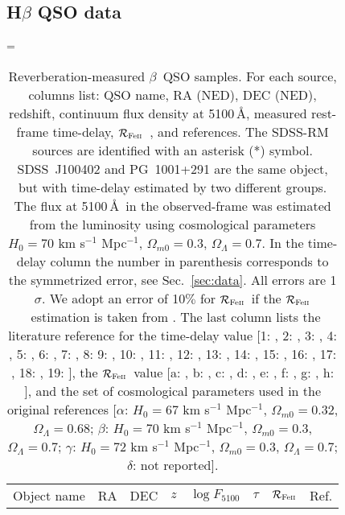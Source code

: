 \documentclass[a4paper,fleqn,usenatbib]{mnras}
\newcommand{\rfe}{${\cal R}_{\rm{Fe\textsc{ii}}}$}
\newcommand{\hb}{{\sc{H}}$\beta$\/}
\begin{document}

\onecolumn
\begin{appendix}
\section{H$\beta$ QSO data}
\label{sec:appendix}
\addtolength{\tabcolsep}{0pt}
\LTcapwidth=\linewidth
\begin{longtable}{cccccccc}
\caption{Reverberation-measured \hb\ QSO samples. For each source, columns list: QSO name, RA (NED), DEC (NED), redshift, continuum flux density at 5100\,\AA, measured rest-frame time-delay, \rfe\ , and references. The SDSS-RM sources are identified with an asterisk (*) symbol. SDSS~J100402 and PG~1001+291 are the same object, but with time-delay estimated by two different groups. The flux at 5100\,\AA\ in the observed-frame was estimated from the luminosity using cosmological parameters $H_0 = 70$ km s$^{-1}$ Mpc$^{-1}$, $\Omega_{m0} = 0.3$, $\Omega_\Lambda = 0.7$. In the time-delay column the number in parenthesis corresponds to the symmetrized error, see Sec.~\ref{sec:data}. All errors are 1$\sigma$. We adopt an error of 10$\%$ for \rfe\ if the \rfe\ estimation is taken from \citet{duwang_2019}. The last column lists the literature reference for the time-delay value [1: \citet{2014ApJ...782...45D}, 2: \citet{wangSEAMBH2014}, 3: \citet{2018ApJ...856....6D}, 4: \citet{2017ApJ...851...21G}, 5: \citet{2013ApJ...767..149B}, 6: \citet{bentz2009}, 7:  \citet{bentz2014}, 8: \citet{pei2014} 9: \citet{bentz2016a}, 10:  \citet{zhang2018}, 11: \citet{lu2016}, 12: \citet{rakshit2020}, 13: \citet{du2015}, 14: \citet{du2016}, 15: \citet{barth2013}, 16: \citet{bentz2016a}, 17: \citet{fausnaugh2017}, 18: \citet{huang2019}, 19: \citet{li_2021}], the \rfe\ value [a: \citet{hu2015}, b: \citet{duwang_2019}, c: \citet{shen_2019},  d: \citet{hu2020}, e: \citet{marziani2003}, f: \citet{du2016funpl}, g: \citet{borosongreen1992}, h: \citet{marziani2003_cat}], and the set of cosmological parameters used in the original references [$\alpha$: $H_0 = 67$ km s$^{-1}$ Mpc$^{-1}$, $\Omega_{m0} = 0.32$, $\Omega_\Lambda = 0.68$; $\beta$: $H_0 = 70$ km s$^{-1}$ Mpc$^{-1}$, $\Omega_{m0} = 0.3$, $\Omega_\Lambda = 0.7$; $\gamma$: $H_0 = 72$ km s$^{-1}$ Mpc$^{-1}$, $\Omega_{m0} = 0.3$, $\Omega_\Lambda = 0.7$; $\delta$: not reported].}
\label{tab:hbQSOdata}\\
\hline\hline
Object name &  RA & DEC & $z$ &  $\log F_{5100}$  &  $\tau$ & \rfe & Ref.  \\

\end{longtable}
\end{appendix}
\end{document}
